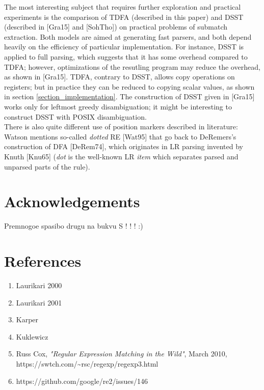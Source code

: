 \documentclass{article}
\theoremstyle{definition}
\begin{document}
\begin{multicols}{2}
The most interesting subject that requires further exploration and practical experiments
is the comparison of TDFA (described in this paper) and DSST (described in [Gra15] and [SohTho])
on practical problems of submatch extraction.
Both models are aimed at generating fast parsers,
and both depend heavily on the efficiency of particular implementation.
For instance, DSST is applied to full parsing, which suggests that it has some overhead compared to TDFA;
however, optimizations of the resutling program may reduce the overhead, as shown in [Gra15].
TDFA, contrary to DSST, allows copy operations on registers;
but in practice they can be reduced to copying scalar values, as shown in section \ref{section_implementation}.
The construction of DSST given in [Gra15] works only for leftmost greedy disambiguation;
it might be interesting to construct DSST with POSIX disambiguation.
\\

There is also quite different use of position markers described in literature:
Watson mentions so-called \emph{dotted} RE [Wat95]
that go back to DeRemers's construction of DFA [DeRem74],
which originates in LR parsing invented by Knuth [Knu65]
(\emph{dot} is the well-known LR \emph{item} which separates parsed and unparsed parts of the rule).

\section*{Acknowledgements}

Premnogoe spasibo drugu na bukvu S ! ! ! :)

\end{multicols}
\pagebreak

\section*{References}

\begin{enumerate}
\item Laurikari 2000
\item Laurikari 2001
\item Karper
\item Kuklewicz

    \item \! [Cox10] Russ Cox, \textit{"Regular Expression Matching in the Wild"}, March 2010, \\
        https://swtch.com/\textasciitilde rsc/regexp/regexp3.html
    \item https://github.com/google/re2/issues/146

\end{enumerate}
\end{document}
